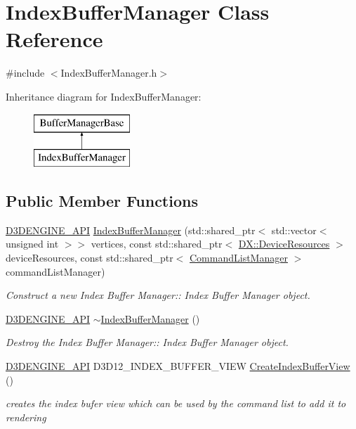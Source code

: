 \hypertarget{class_index_buffer_manager}{}\section{Index\+Buffer\+Manager Class Reference}
\label{class_index_buffer_manager}


{\ttfamily \#include $<$Index\+Buffer\+Manager.\+h$>$}

Inheritance diagram for Index\+Buffer\+Manager\+:\begin{figure}[H]
\begin{center}
\leavevmode
\includegraphics[height=2.000000cm]{d9/d4b/class_index_buffer_manager}
\end{center}
\end{figure}
\subsection*{Public Member Functions}
\begin{DoxyCompactItemize}
\item 
\mbox{\hyperlink{stdafx_8h_a8ee2d990c5dfba7794dd2b60741d7722}{D3\+D\+E\+N\+G\+I\+N\+E\+\_\+\+A\+PI}} \mbox{\hyperlink{class_index_buffer_manager_a58352b8fc2032a4e29faed7fbe249ea0}{Index\+Buffer\+Manager}} (std\+::shared\+\_\+ptr$<$ std\+::vector$<$ unsigned int $>$$>$ vertices, const std\+::shared\+\_\+ptr$<$ \mbox{\hyperlink{class_d_x_1_1_device_resources}{D\+X\+::\+Device\+Resources}} $>$ device\+Resources, const std\+::shared\+\_\+ptr$<$ \mbox{\hyperlink{class_command_list_manager}{Command\+List\+Manager}} $>$ command\+List\+Manager)
\begin{DoxyCompactList}\small\item\em Construct a new Index Buffer Manager\+:\+: Index Buffer Manager object. \end{DoxyCompactList}\item 
\mbox{\hyperlink{stdafx_8h_a8ee2d990c5dfba7794dd2b60741d7722}{D3\+D\+E\+N\+G\+I\+N\+E\+\_\+\+A\+PI}} \mbox{\hyperlink{class_index_buffer_manager_af5f43b500ab9536bb2b598e94b7951b9}{$\sim$\+Index\+Buffer\+Manager}} ()
\begin{DoxyCompactList}\small\item\em Destroy the Index Buffer Manager\+:\+: Index Buffer Manager object. \end{DoxyCompactList}\item 
\mbox{\hyperlink{stdafx_8h_a8ee2d990c5dfba7794dd2b60741d7722}{D3\+D\+E\+N\+G\+I\+N\+E\+\_\+\+A\+PI}} D3\+D12\+\_\+\+I\+N\+D\+E\+X\+\_\+\+B\+U\+F\+F\+E\+R\+\_\+\+V\+I\+EW \mbox{\hyperlink{class_index_buffer_manager_a061f4f1d39af54908dbd31eb9afa03fa}{Create\+Index\+Buffer\+View}} ()
\begin{DoxyCompactList}\small\item\em creates the index bufer view which can be used by the command list to add it to rendering \end{DoxyCompactList}\end{DoxyCompactItemize}
